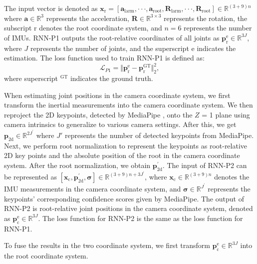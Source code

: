 \documentclass[sigconf,nonacm=true]{acmart}
\begin{document}
The input vector is denoted as $\boldsymbol{x}_{\mathrm{r}}=\left[\boldsymbol{a}_{\mathrm{larm}},\cdot\cdot\cdot,\boldsymbol{a}_{\mathrm{root}},\boldsymbol{R}_{\mathrm{larm}},\cdot\cdot\cdot,\boldsymbol{R}_{\mathrm{root}}\right]\in\mathbb{R}^{(3+9)n}$ where $\boldsymbol{a}\in\mathbb{R}^3$ represents the acceleration, $\boldsymbol{R}\in\mathbb{R}^{3\times3}$ represents the rotation, the subscript $\mathrm{r}$ denotes the root coordinate system, and $n=6$ represents the number of IMUs.
RNN-P1 outputs the root-relative coordinates of all joints as $\boldsymbol{p}_{\mathrm{r}}^{\mathrm{e}}\in\mathbb{R}^{3J}$, where $J$ represents the number of joints, and the superscript $\mathrm{e}$ indicates the estimation.
The loss function used to train  RNN-P1 is defined as:
\begin{equation}
    \mathcal{L}_{P1}=\Vert \boldsymbol{p}_{\mathrm{r}}^{\mathrm{e}}-\boldsymbol{p}_\mathrm{r}^{\mathrm{GT}} \Vert_2^{2},
\end{equation}
where superscript $^{\mathrm{GT}}$ indicates the ground truth.
\par
When estimating joint positions in the camera coordinate system, we first transform the inertial measurements into the camera coordinate system.
We then reproject the 2D keypoints, detected by MediaPipe \cite{mediapipe}, onto the $Z$ = 1 plane using camera intrinsics to generalize to various camera settings.
After this, we get $\boldsymbol{p}_{\mathrm{2d}}\in\mathbb{R}^{2J^{'}}$ where $J'$ represents the number of detected keypoints from MediaPipe.
Next, we perform root normalization to represent the keypoints as root-relative 2D key points and the absolute position of the root in the camera coordinate system.
After the root normalization, we obtain $\boldsymbol{p}_{\mathrm{2d}}^{'}$.
The input of RNN-P2 can be represented as $[\boldsymbol{x}_{\mathrm{c}},\boldsymbol{p}_{\mathrm{2d}}^{'},\boldsymbol{\sigma}]\in\mathbb{R}^{(3+9)n+3J^{'}}$, where $\boldsymbol{x}_{\mathrm{c}}\in\mathbb{R}^{(3+9)n}$ denotes the IMU measurements in the camera coordinate system, and $\boldsymbol{\sigma}\in\mathbb{R}^{J^{'}}$ represents the keypoints' corresponding confidence scores given by MediaPipe.
The output of RNN-P2 is root-relative joint positions in the camera coordinate system, denoted as $\boldsymbol{p}_{\mathrm{c}}^{\mathrm{e}}\in\mathbb{R}^{3J}$.
The loss function for RNN-P2 is the same as the loss function for RNN-P1.
\par
To fuse the results in the two coordinate system, we first transform $\boldsymbol{p}_{\mathrm{c}}^{\mathrm{e}}\in\mathbb{R}^{3J}$ into the root coordinate system.
\end{document}
